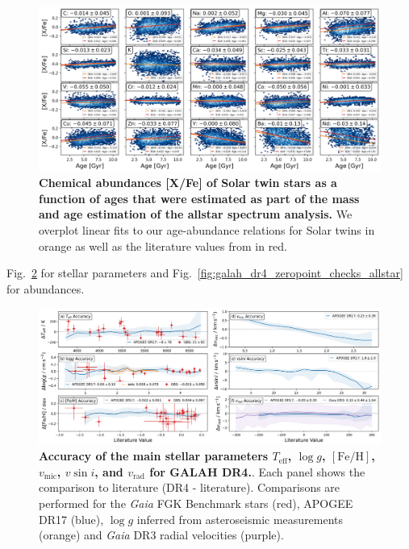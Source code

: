 \documentclass[
  journal=pasa,
  manuscript=research-paper, %
  year=2023,
  volume=37
]{cup-journal}
\newcommand{\SB}[1]{{\textcolor{purple}{#1}}}
\newcommand{\Teff}{$T_\mathrm{eff}$\xspace}
\newcommand{\logg}{$\log g$\xspace}
\newcommand{\feh}{$\mathrm{[Fe/H]}$\xspace}
\newcommand{\vmic}{$v_\mathrm{mic}$\xspace}
\newcommand{\vsini}{$v \sin i$\xspace}
\newcommand{\vrad}{$v_\mathrm{rad}$\xspace}
\newcommand{\Gaia}{\textit{Gaia}\xspace}
\begin{document}
\begin{figure}[ht]
 \centering
 \includegraphics[width=\textwidth]{figures/galah_dr4_age_xfe_trends_solar_twins_allstar.png}
 \caption{\textbf{Chemical abundances [X/Fe] of Solar twin stars as a function of ages that were estimated as part of the mass and age estimation of the allstar spectrum analysis.} We overplot linear fits to our age-abundance relations for Solar twins in orange as well as the literature values from \citet{Bedell2018} in red.}
 \label{fig:galah_dr4_age_xfe_trends_solar_twins_allstar}
\end{figure}



Fig.~\ref{fig:galah_dr4_validation_parameter_accuracy_allstar} for stellar parameters and Fig.~\ref{fig:galah_dr4_zeropoint_checks_allstar} for abundances.

\begin{figure}[ht]
 \centering
 \includegraphics[width=\textwidth]{figures/galah_dr4_validation_parameter_accuracy_allstar.png}
 \caption{\textbf{Accuracy of the main stellar parameters \Teff, \logg, \feh, \vmic, \vsini, and \vrad for GALAH DR4.}. Each panel shows the comparison to literature (DR4 - literature). Comparisons are performed for the \Gaia FGK Benchmark stars (red), APOGEE DR17 (blue), \logg inferred from asteroseismic measurements (orange) and \Gaia DR3 radial velocities (purple).}
 \label{fig:galah_dr4_validation_parameter_accuracy_allstar}
\end{figure}
\end{document}
